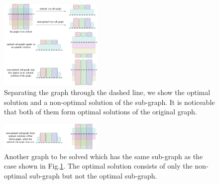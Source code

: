 \documentclass[conference]{IEEEtran}
\begin{document}

\begin{figure}[t]
\centering
\includegraphics[width=0.44\textwidth]{figures/local}
\caption{Separating the graph through the dashed line, we show the optimal solution and a non-optimal solution of the sub-graph. It is noticeable that both of them form optimal solutions of the original graph. }\label{fig:non_optimal_subgraph}
\end{figure}

\begin{figure}[t]
\centering
\includegraphics[width=0.44\textwidth]{figures/local_in_other_graph}
\caption{Another graph to be solved which has the same sub-graph as the case shown in Fig.\ref{fig:non_optimal_subgraph}. The optimal solution consists of only the non-optimal sub-graph but not the optimal sub-graph. }\label{fig:local_in_other_graph}
\end{figure}
\end{document}
